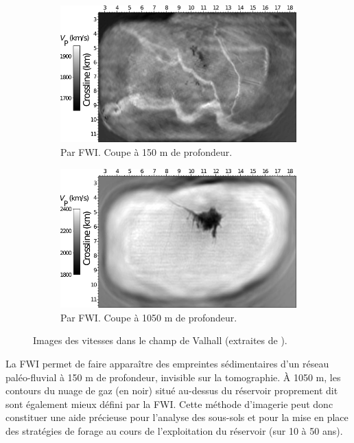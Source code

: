 \begin{figure}[!h]
\begin{subfigure}[b]{0.4\textwidth}
        \label{}
    \end{subfigure}\\[0.5cm]
    \begin{subfigure}[b]{0.4\textwidth}
        \includegraphics[width=\textwidth]{img/geophy3.png}
        \caption{Par FWI. Coupe à 150 m de profondeur.}
        \label{}
    \end{subfigure}
    \hspace{0.5cm}
    \begin{subfigure}[b]{0.4\textwidth}
        \includegraphics[width=\textwidth]{img/geophy4.png}
        \caption{Par FWI. Coupe à 1050 m de profondeur.}
        \label{}
    \end{subfigure}
    \caption{Images des vitesses dans le champ de Valhall (extraites de \cite{sirgue_valhall}).\label{valhall}}
\end{figure} 
   
La FWI permet de faire apparaître des empreintes sédimentaires d'un réseau paléo-fluvial à 150 m de profondeur, invisible sur la tomographie. À 1050 m, les contours du nuage de gaz (en noir) situé au-dessus du réservoir proprement dit sont également mieux défini par la FWI. Cette méthode d'imagerie peut donc constituer une aide précieuse pour l'analyse des sous-sols et pour la mise en place des stratégies de forage au cours de l'exploitation du réservoir (sur 10 à 50 ans).\\

